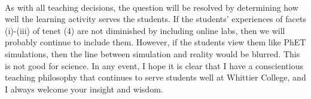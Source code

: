 \documentclass[../../../main.tex]{subfiles}
\begin{document}
\\
\vspace{0.15cm}
As with all teaching decisions, the question will be resolved by determining how well the learning activity serves the students.  If the students' experiences of facets (i)-(iii) of tenet (4) are not diminished by including online labs, then we will probably continue to include them.  However, if the students view them like PhET simulations, then the line between simulation and reality would be blurred.  This is not good for science.  In any event, I hope it is clear that I have a conscientious teaching philosophy that continues to serve students well at Whittier College, and I always welcome your insight and wisdom.
\end{document}
